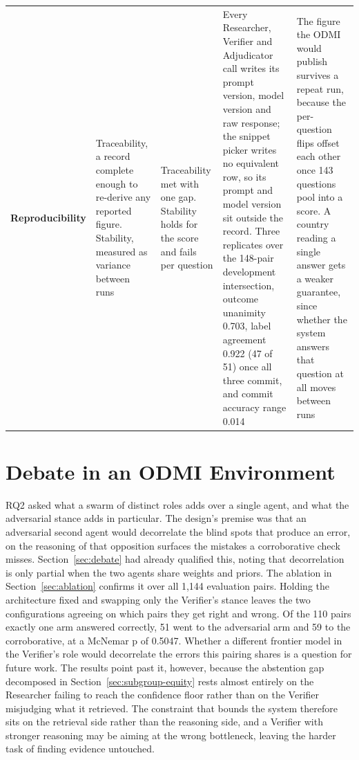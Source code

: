{\begin{longtable}[]{@{}
  L{0.1635}
  L{0.1641}
  L{0.1111}
  L{0.2806}
  L{0.2806}@{}}
\textbf{Reproduc\-ibility} & Traceability, a record complete enough to re-derive any reported figure. Stability, measured as variance between runs & Trace\-ability met with one gap. Stability holds for the score and fails per question & Every Researcher, Verifier and Adjudicator call writes its prompt version, model version and raw response; the snippet picker writes no equivalent row, so its prompt and model version sit outside the record. Three replicates over the 148-pair development intersection, outcome unanimity 0.703, label agreement 0.922 (47 of 51) once all three commit, and commit accuracy range 0.014 & The figure the ODMI would publish survives a repeat run, because the per-question flips offset each other once 143 questions pool into a score. A country reading a single answer gets a weaker guarantee, since whether the system answers that question at all moves between runs \\
\end{longtable}
}


\section{Debate in an ODMI Environment}\label{sec:debate-odmi}

RQ2 asked what a swarm of distinct roles adds over a single agent, and what the adversarial stance adds in particular. The design's premise was that an adversarial second agent would decorrelate the blind spots that produce an error, on the reasoning of \citet{cohen2023} that opposition surfaces the mistakes a corroborative check misses. Section~\ref{sec:debate} had already qualified this, noting that decorrelation is only partial when the two agents share weights and priors. The ablation in Section~\ref{sec:ablation} confirms it over all 1,144 evaluation pairs. Holding the architecture fixed and swapping only the Verifier's stance leaves the two configurations agreeing on which pairs they get right and wrong. Of the 110 pairs exactly one arm answered correctly, 51 went to the adversarial arm and 59 to the corroborative, at a McNemar p of 0.5047. Whether a different frontier model in the Verifier's role would decorrelate the errors this pairing shares is a question for future work. The results point past it, however, because the abstention gap decomposed in Section~\ref{sec:subgroup-equity} rests almost entirely on the Researcher failing to reach the confidence floor rather than on the Verifier misjudging what it retrieved. The constraint that bounds the system therefore sits on the retrieval side rather than the reasoning side, and a Verifier with stronger reasoning may be aiming at the wrong bottleneck, leaving the harder task of finding evidence untouched.

